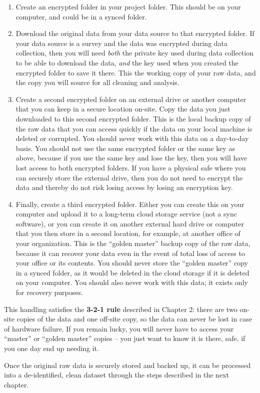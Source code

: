 \begin{enumerate}
	\item Create an encrypted folder in your project folder.
	This should be on your computer, and could be in a synced folder.

	\item Download the original data from your data source to that encrypted folder.
	If your data source is a survey and the data was encrypted during data collection,
	then you will need \textit{both} the
	private key used during data collection to be able to download the data,
	\textit{and} the key used when you created the encrypted folder to save it there.
	This the working copy of your raw data, and the copy you will source for all cleaning and analysis.

	\item Create a second encrypted folder on an external drive or another computer that you can keep in a secure location on-site.
	Copy the data you just downloaded to this second encrypted folder.
	This is the local backup copy of the raw data
	that you can access quickly if the data on your local machine is deleted or corrupted.
	You should never work with this data on a day-to-day basis.
	You should not use the same encrypted folder or the same key as above,
	because if you use the same key and lose the key,
	then you will have lost access to both encrypted folders.
	If you have a physical safe where you can securely store the external drive,
	then you do not need to encrypt the data
	and thereby do not risk losing access by losing an encryption key.

	\item Finally, create a third encrypted folder.
	Either you can create this on your computer and upload it to a long-term cloud storage service (not a sync software),
	or you can create it on	another external hard drive or computer that you then store in a second location,
	for example, at another office of your organization.
	This is the ``golden master'' backup copy of the raw data,
	because it can recover your data even in the event of
	total loss of access to your office or its contents.
	You should never store the ``golden master'' copy in a synced folder,
	as it would be deleted in the cloud storage if it is deleted on your computer.
	You should also never work with this data;
	it exists only for recovery purposes.
\end{enumerate}

\noindent This handling satisfies the \textbf{3-2-1 rule} described in Chapter 2:
there are two on-site copies of the data and one off-site copy,
so the data can never be lost in case of hardware failure.
If you remain lucky, you will never have to access your ``master'' or ``golden master'' copies --
you just want to know it is there, safe, if you one day end up needing it.


Once the original raw data is securely stored and backed up,
it can be processed into a de-identified, clean dataset
through the steps described in the next chapter.
